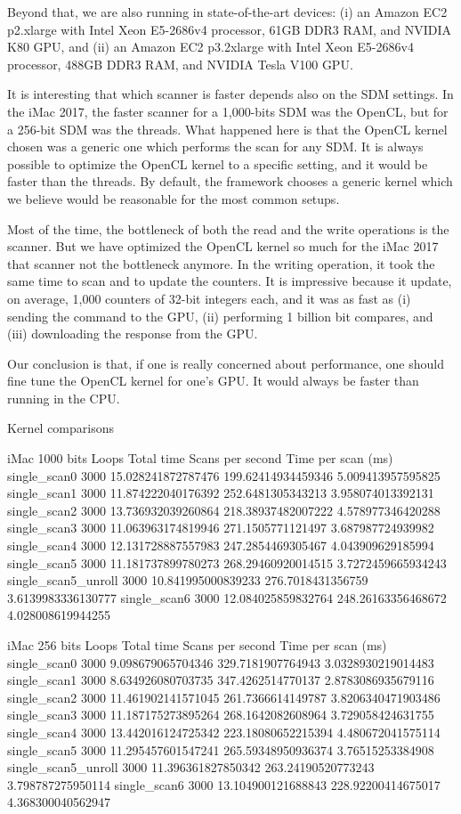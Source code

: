 Beyond that, we are also running in state-of-the-art devices: (i) an Amazon EC2 p2.xlarge with Intel Xeon E5-2686v4 processor, 61GB DDR3 RAM, and NVIDIA K80 GPU, and (ii) an Amazon EC2 p3.2xlarge with Intel Xeon E5-2686v4 processor, 488GB DDR3 RAM, and NVIDIA Tesla V100 GPU.

It is interesting that which scanner is faster depends also on the SDM settings. In the iMac 2017, the faster scanner for a 1,000-bits SDM was the OpenCL, but for a 256-bit SDM was the threads. What happened here is that the OpenCL kernel chosen was a generic one which performs the scan for any SDM. It is always possible to optimize the OpenCL kernel to a specific setting, and it would be faster than the threads. By default, the framework chooses a generic kernel which we believe would be reasonable for the most common setups.

Most of the time, the bottleneck of both the read and the write operations is the scanner. But we have optimized the OpenCL kernel so much for the iMac 2017 that scanner not the bottleneck anymore. In the writing operation, it took the same time to scan and to update the counters. It is impressive because it update, on average, 1,000 counters of 32-bit integers each, and it was as fast as (i) sending the command to the GPU, (ii) performing 1 billion bit compares, and (iii) downloading the response from the GPU.

Our conclusion is that, if one is really concerned about performance, one should fine tune the OpenCL kernel for one's GPU. It would always be faster than running in the CPU.


Kernel comparisons

iMac 1000 bits
Loops	Total time	Scans per second	Time per scan (ms)
single\_scan0	3000	15.028241872787476	199.62414934459346	5.009413957595825
single\_scan1	3000	11.874222040176392	252.6481305343213	3.958074013392131
single\_scan2	3000	13.736932039260864	218.38937482007222	4.578977346420288
single\_scan3	3000	11.063963174819946	271.1505771121497	3.687987724939982
single\_scan4	3000	12.131728887557983	247.2854469305467	4.043909629185994
single\_scan5	3000	11.181737899780273	268.29460920014515	3.7272459665934243
single\_scan5\_unroll	3000	10.841995000839233	276.7018431356759	3.6139983336130777
single\_scan6	3000	12.084025859832764	248.26163356468672	4.028008619944255


iMac 256 bits
Loops	Total time	Scans per second	Time per scan (ms)
single\_scan0	3000	9.098679065704346	329.7181907764943	3.0328930219014483
single\_scan1	3000	8.634926080703735	347.4262514770137	2.8783086935679116
single\_scan2	3000	11.461902141571045	261.7366614149787	3.8206340471903486
single\_scan3	3000	11.187175273895264	268.1642082608964	3.729058424631755
single\_scan4	3000	13.442016124725342	223.18080652215394	4.480672041575114
single\_scan5	3000	11.295457601547241	265.59348950936374	3.76515253384908
single\_scan5\_unroll	3000	11.396361827850342	263.24190520773243	3.798787275950114
single\_scan6	3000	13.104900121688843	228.92200414675017	4.368300040562947


